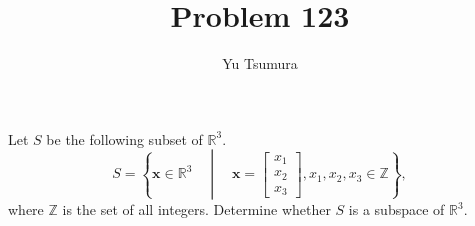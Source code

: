 \documentclass{ximera}
\title{Problem 123}
\author{Yu Tsumura}
\begin{document}
\begin{problem}
	 	 Let $S$ be the following subset of $\mathbb{R}^3$.
	\[S=\left\{ \mathbf{x}\in \mathbb{R}^3 \quad \middle| \quad \mathbf{x}=\begin{bmatrix}
	  x_1 \\
	   x_2 \\
	    x_3 
	  \end{bmatrix}, x_1, x_2, x_3 \in \mathbb{Z} \right\}, \]
	where $\mathbb{Z}$ is the set of all integers.
	  Determine whether $S$ is a subspace of $\mathbb{R}^3$.
          \begin{multipleChoice}
          \end{multipleChoice}


        \end{problem}
        
\end{document}
